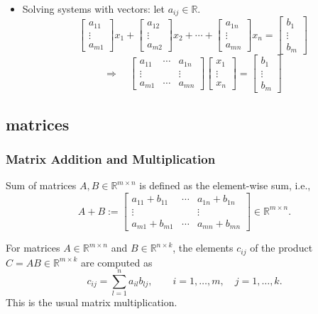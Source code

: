 \documentclass[12pt, letterpaper]{article}
\begin{document}
\begin{itemize}
  \item Solving systems with vectors: let $a_{ij} \in \mathbb{R}$.
  \[
    \begin{bmatrix}
      a_{11} \\
      \vdots \\
      a_{m1}
    \end{bmatrix} x_1 + \begin{bmatrix}
      a_{12} \\
      \vdots \\
      a_{m2}
    \end{bmatrix} x_2 + \cdots + \begin{bmatrix}
      a_{1n} \\
      \vdots \\
      a_{mn}
    \end{bmatrix} x_n = \begin{bmatrix}
      b_1 \\
      \vdots \\
      b_m
    \end{bmatrix}
  \]
  \[
    \Rightarrow\quad
    \begin{bmatrix}
      a_{11} & \cdots & a_{1n} \\
      \vdots &        & \vdots \\
      a_{m1} & \cdots & a_{mn}
    \end{bmatrix}
    \begin{bmatrix}
      x_1 \\
      \vdots \\
      x_n
    \end{bmatrix} = \begin{bmatrix}
      b_1 \\
      \vdots \\
      b_m
    \end{bmatrix}
  \]

\end{itemize}

\subsection{matrices}

\subsubsection{Matrix Addition and Multiplication}

Sum of matrices $A, B \in \mathbb{R}^{m \times n}$ is defined as
the element-wise sum, i.e.,
\[
  A + B := \begin{bmatrix}
    a_{11} + b_{11} & \cdots & a_{1n} + b_{1n} \\
    \vdots & & \vdots \\
    a_{m1} + b_{m1} & \cdots & a_{mn} + b_{mn}
  \end{bmatrix} \in \mathbb{R}^{m \times n}.
  \tag{2.12}
\]

For matrices $A \in \mathbb{R}^{m \times n}$ and
$B \in \mathbb{R}^{n \times k}$, the elements $c_{ij}$ of the product
$C = AB \in \mathbb{R}^{m \times k}$ are computed as
\[
  c_{ij} = \sum_{l=1}^{n} a_{il}b_{lj},
  \qquad i = 1, \ldots, m, \quad j = 1, \ldots, k.
  \tag{2.13}
\]
This is the usual matrix multiplication.
\end{document}
